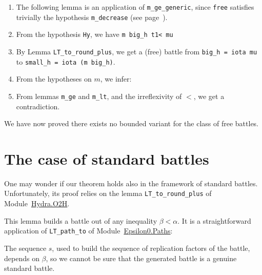 \begin{enumerate}
\item The following lemma is an application of \texttt{m\_ge\_generic}, since \texttt{free}
satisfies trivially the hypothesis \texttt{m\_decrease} (see page~\pageref{remark:m-decrease}).

\pagebreak



\item From the hypothesis \texttt{Hy}, we have \texttt{m big\_h t1< mu}
\item By Lemma \texttt{LT\_to\_round\_plus}, we get a (free) battle from
\texttt{big\_h = iota mu} to \texttt{small\_h = iota (m big\_h)}.




\item From the hypotheses on $m$, we infer:


\item From lemmas \texttt{m\_ge} and \texttt{m\_lt}, and the irreflexivity of $<$, we get a contradiction. 


\end{enumerate}

We have now proved there exists no bounded variant for the class of free battles.




\section{The case of standard battles}
\label{sec:standard-intro}\label{std-case}
One may wonder if our theorem holds also in the framework of standard battles. Unfortunately, its proof relies on the lemma \texttt{LT\_to\_round\_plus} of
Module~\href{../theories/html/hydras.Hydra.O2H.html}{Hydra.O2H}.



This lemma builds a battle out of any inequality $\beta<\alpha$. 
It is a straightforward application of \texttt{LT\_path\_to} of
Module~\href{../theories/html/hydras.Epsilon0.Paths.html}{Epsilon0.Paths}:



The sequence $s$, used to build the sequence of replication factors of the battle, depends on 
$\beta$, so we cannot be sure that the generated battle is a genuine standard battle.


